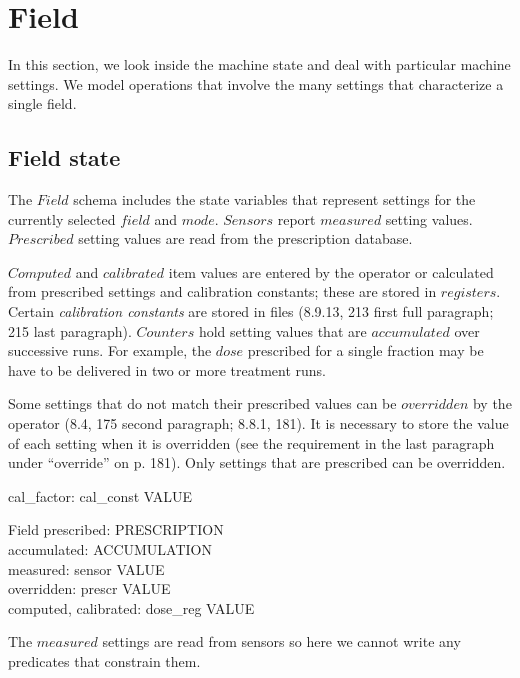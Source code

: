 \documentclass{article}
\begin{document}
\section{Field} \label{sect:field}

In this section, we look inside the machine state and deal
with particular machine settings.  We model operations that involve
the many settings that characterize a single field.

\subsection{Field state}

The $Field$ schema includes the state variables that represent
settings for the currently selected $field$ and $mode$.  $Sensors$
report $measured$ setting values.  $Prescribed$ setting values are
read from the prescription database.

$Computed$ and $calibrated$ item values are entered by the operator or
calculated from prescribed settings and calibration constants; these
are stored in $registers$.  Certain {\em calibration constants} are
stored in files (8.9.13, 213 first full paragraph; 215 last
paragraph).  $Counters$ hold setting values that are $accumulated$
over successive runs.  For example, the $dose$ prescribed for a single
fraction may be have to be delivered in two or more treatment runs.

Some settings that do not match their prescribed values can be
$overridden$ by the operator (8.4, 175 second paragraph; 8.8.1, 181).
It is necessary to store the value of each setting when it is
overridden (see the requirement in the last paragraph under
``override'' on p.  181).  Only settings that are prescribed can be
overridden.

\begin{axdef}
	cal\_factor: cal\_const \fun VALUE
\end{axdef}

\begin{schema}{Field}
	prescribed: PRESCRIPTION \\
	accumulated: ACCUMULATION \\
	measured: sensor \fun VALUE \\
	overridden: prescr \pfun VALUE \\
	computed, calibrated: dose\_reg \fun VALUE \\
\end{schema}
The $measured$ settings are read from sensors so here we cannot write any
predicates that constrain them.
\end{document}
